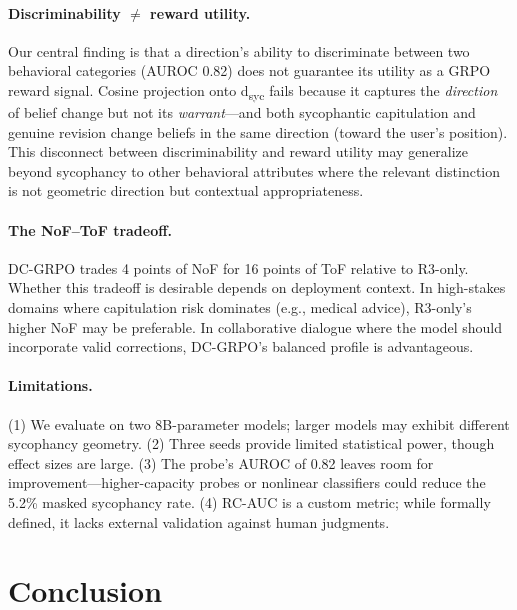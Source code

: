 \documentclass[11pt,a4paper]{article}
\begin{document}
\paragraph{Discriminability $\neq$ reward utility.}
Our central finding is that a direction's ability to discriminate between two behavioral categories (AUROC 0.82) does not guarantee its utility as a GRPO reward signal.
Cosine projection onto d\textsubscript{syc} fails because it captures the \emph{direction} of belief change but not its \emph{warrant}---and both sycophantic capitulation and genuine revision change beliefs in the same direction (toward the user's position).
This disconnect between discriminability and reward utility may generalize beyond sycophancy to other behavioral attributes where the relevant distinction is not geometric direction but contextual appropriateness.

\paragraph{The NoF--ToF tradeoff.}
DC-GRPO trades 4 points of NoF for 16 points of ToF relative to R3-only.
Whether this tradeoff is desirable depends on deployment context.
In high-stakes domains where capitulation risk dominates (e.g., medical advice), R3-only's higher NoF may be preferable.
In collaborative dialogue where the model should incorporate valid corrections, DC-GRPO's balanced profile is advantageous.

\paragraph{Limitations.}
(1) We evaluate on two 8B-parameter models; larger models may exhibit different sycophancy geometry.
(2) Three seeds provide limited statistical power, though effect sizes are large.
(3) The probe's AUROC of 0.82 leaves room for improvement---higher-capacity probes or nonlinear classifiers could reduce the 5.2\% masked sycophancy rate.
(4) RC-AUC is a custom metric; while formally defined, it lacks external validation against human judgments.

\section{Conclusion}
\end{document}
